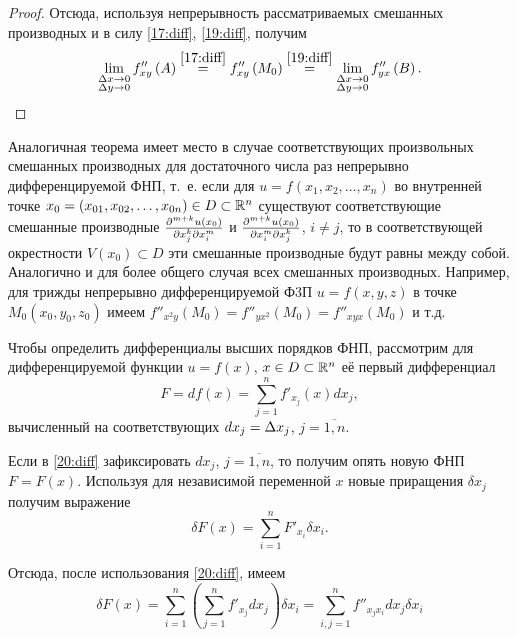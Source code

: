 \documentclass[../../main.tex]{subfiles}
\begin{document}
\begin{proof}
		Отсюда, используя непрерывность рассматриваемых смешанных 
		производных и в силу \eqref{17:diff}, \eqref{19:diff}, получим
		\[\lim_{
			\substack{\Delta x\rightarrow0\\
					\Delta y\rightarrow 0}
				}f''_{xy}\left(A\right)\overset{\eqref{17:diff}}{=}
		f''_{xy}\left(M_0\right)\overset{\eqref{19:diff}}{=}
		\lim_{
			\substack{\Delta x\rightarrow0\\
					\Delta y\rightarrow0}
				}f''_{yx}\left(B\right).\]
	\end{proof}

	\begin{rem}
		Аналогичная теорема имеет место в случае соответствующих 
		произвольных смешанных производных для достаточного числа 
		раз непрерывно дифференцируемой ФНП, т.~е. если для 
		$u = f\left(x_1, x_2,\dots, x_n\right)$ во внутренней 
		точке $x_0 = \left(x_{01}, x_{02},\dots, x_{0n}\right)
		\in D\subset \mathbb{R}^n$ существуют соответствующие смешанные 
		производные $\frac{\partial ^{m+k}u\left(x_0\right)}{\partial x_j^k\partial x_i^m}$ и 
		$\frac{\partial ^{m+k}u\left(x_0\right)}{\partial x_i^m\partial x_j^k}$, $i\ne j$, 
		то в соответствующей окрестности $V\left(x_0\right)\subset D$ эти 
		смешанные производные будут равны между собой. Аналогично и для более 
		общего случая всех смешанных производных. Например, для трижды 
		непрерывно дифференцируемой Ф3П $u=f\left(x, y, z\right)$ в точке 
		$M_0\left(x_0, y_0, z_0\right)$ имеем
		$f''_{x^2y}\left(M_0\right) = f''_{yx^2}\left(M_0\right) = 
		f''_{xyx}\left(M_0\right)$ и т.д.
	\end{rem}

	Чтобы определить дифференциалы высших порядков ФНП, рассмотрим для 
	дифференцируемой функции $u=f\left(x\right)$, $x\in D\subset \mathbb{R}^n$ 
	её первый дифференциал
	\begin{equation}
		F = df\left(x\right) = \sum_{j = 1}^nf'_{x_j}\left(x\right)dx_j,
		\label{20:diff}
	\end{equation}
	вычисленный на соответствующих $dx_j = \Delta x_j$, $j = \overline{1, n}$.
	
	Если в \eqref{20:diff} зафиксировать $dx_j$, $j = \overline{1, n}$, то 
	получим опять новую ФНП $F = F(x)$. Используя для независимой переменной 
	$x$ новые приращения $\delta x_j$ получим выражение
	\[\delta F(x) = \sum_{i = 1}^nF'_{x_i}\delta x_i.\]
	
	Отсюда, после использования \eqref{20:diff}, имеем
	\begin{equation}
		\delta F(x) = \sum_{i = 1}^n\left(\sum_{j = 1}^nf'_{x_j}dx_j\right)
		\delta x_i = \sum_{i, j = 1}^nf''_{x_jx_i}dx_j\delta x_i
		\label{21:diff}
	\end{equation}
	
\end{document}
